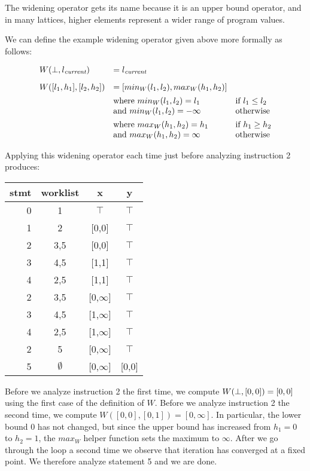 \documentclass[11pt]{article}
\begin{document}
The widening operator gets its name because it is an upper bound operator, and
in many lattices, higher elements represent a wider range of program values.

We can define the example widening operator given above more formally as follows:

\[
\begin{array}{lll}

W(\bot,l_\textit{current}) & = l_\textit{current} \\[2ex]
W([l_1,h_1],[l_2,h_2]) & = [min_W(l_1, l_2), max_W(h_1, h_2)] \\[1ex]
& \mbox{where}~ min_W(l_1, l_2) = l_1 & \mbox{if}~ l_1 \le l_2 \\
& \mbox{and}~ min_W(l_1, l_2) = -\infty & \mbox{otherwise} \\[1ex]
& \mbox{where}~ max_W(h_1, h_2) = h_1 & \mbox{if}~ h_1 \ge h_2 \\
& \mbox{and}~ max_W(h_1, h_2) = \infty & \mbox{otherwise} \\

\end{array}
\]

Applying this widening operator each time just before analyzing instruction 2 produces:

\begin{center}
\begin{tabular}{r | c | c c}
stmt & worklist & x & y \\
\hline
0  & 1   & $\top$ & $\top$ \\
1  & 2   & [0,0] & $\top$ \\
2  & 3,5 & [0,0] & $\top$ \\
3  & 4,5 & [1,1] & $\top$ \\
4  & 2,5 & [1,1] & $\top$ \\
2  & 3,5 & [0,$\infty$] & $\top$ \\
3  & 4,5 & [1,$\infty$] & $\top$ \\
4  & 2,5 & [1,$\infty$] & $\top$ \\
2  & 5 & [0,$\infty$] & $\top$ \\
5  & $\emptyset$ & [0,$\infty$] & [0,0] \\
\end{tabular}
\tablespace
\end{center}

Before we analyze instruction 2 the first time, we compute $W(\bot, [0,0]) = [0,0]$ using the first case of the definition of $W$.  Before we analyze instruction 2 the second time, we compute $W([0,0], [0,1]) = [0,\infty]$.  In particular, the lower bound $0$ has not changed, but since the upper bound has increased from $h_1=0$ to $h_2=1$, the $max_W$ helper function sets the maximum to $\infty$.  After we go through the loop a second time we observe that iteration has converged at a fixed point.  We therefore analyze statement 5 and we are done.
\end{document}
